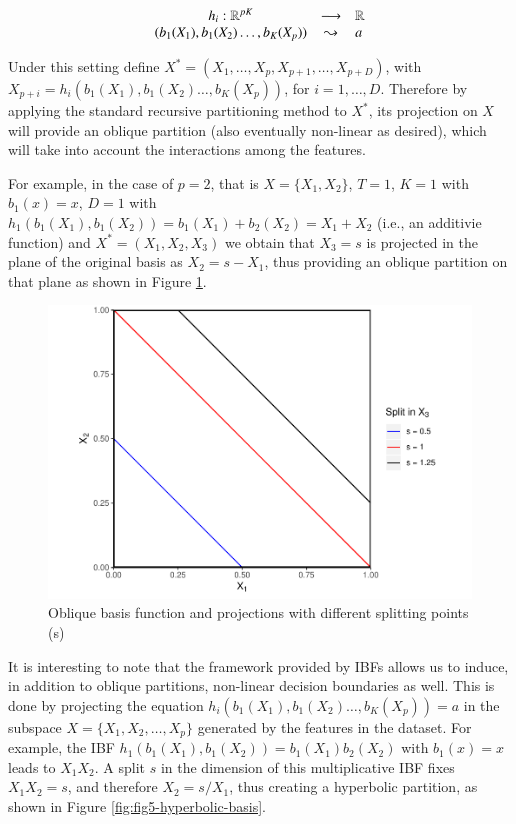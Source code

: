 \documentclass[]{elsarticle} %
\makeatletter
\def\maxwidth{\ifdim\Gin@nat@width>\linewidth\linewidth
\else\Gin@nat@width\fi}
\let\Oldincludegraphics\includegraphics
\renewcommand{\includegraphics}[1]{\Oldincludegraphics[width=\maxwidth]{#1}}
\makeatother
\begin{document}
\[
\begin{array}{ccl}h_{i}:\mathbb{R}^{pK}&\longrightarrow&\mathbb{R}\\{\tiny (b_1(X_1),b_1(X_2)\dots, b_K(X_p))}&\leadsto &a\end{array}
\]

Under this setting define
\(X^{\ast }=\left( X_{1},\dots,X_{p},X_{p+1},\dots ,X_{p+D} \right)\),
with \(X_{p+i}=h_i(b_1(X_1),b_1(X_2)\dots, b_K(X_p))\), for
\(i=1,\dots ,D\). Therefore by applying the standard recursive
partitioning method to \(X^\ast\), its projection on \(X\) will provide
an oblique partition (also eventually non-linear as desired), which will
take into account the interactions among the features.

For example, in the case of \(p=2\), that is \(X=\{X_1,X_2\}\), \(T=1\),
\(K=1\) with \(b_1(x)=x\), \(D=1\) with
\(h_1(b_1(X_1),b_1(X_2))=b_1(X_1)+b_2(X_2)=X_1+X_2\) (i.e., an additivie
function) and \(X^{\ast }=\left( X_{1},X_{2},X_{3} \right)\) we obtain
that \(X_3=s\) is projected in the plane of the original basis as
\(X_2=s-X_1\), thus providing an oblique partition on that plane as
shown in Figure \ref{fig:fig4-additive-basis}.

\begin{figure}
\centering
\includegraphics{Trees_with_Base_Functions_v3_files/figure-latex/fig4-additive-basis-1.pdf}
\caption{\label{fig:fig4-additive-basis}Oblique basis function and
projections with different splitting points (s)}
\end{figure}

It is interesting to note that the framework provided by IBFs allows us
to induce, in addition to oblique partitions, non-linear decision
boundaries as well. This is done by projecting the equation
\(h_i(b_1(X_1),b_1(X_2)\dots, b_K(X_p))=a\) in the subspace
\(X=\{X_1, X_2,\dots, X_p\}\) generated by the features in the dataset.
For example, the IBF \(h_1(b_1(X_1),b_1(X_2))=b_1(X_1)b_2(X_2)\) with
\(b_1(x)=x\) leads to \(X_1X_2\). A split \(s\) in the dimension of this
multiplicative IBF fixes \(X_1X_2=s\), and therefore \(X_2=s/X_1\), thus
creating a hyperbolic partition, as shown in Figure
\ref{fig:fig5-hyperbolic-basis}.
\end{document}
